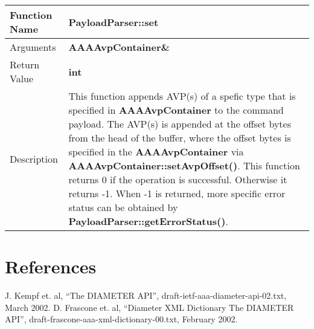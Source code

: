 \begin{flushleft}
\begin{tabular}[t]{|l|p{3in}|}\hline
 Function Name & {\bf PayloadParser::set}
\\\hline
 Arguments & {\bf AAAAvpContainer\&}\\\hline
 Return Value & {\bf int}
\\\hline
 Description &  
 This function appends AVP(s) of a spefic type that is specified 
 in {\bf AAAAvpContainer} to the command payload.  The AVP(s) is appended 
 at the offset bytes from the head of the buffer, where the offset bytes
 is specified in the {\bf AAAAvpContainer} via {\bf
 AAAAvpContainer::setAvpOffset()}.
 This function returns 0 if 
 the operation is successful.  Otherwise it returns -1.  
 When -1 is returned, more specific
 error status can be obtained by {\bf PayloadParser::getErrorStatus()}.
\\\hline
\end{tabular}
\end{flushleft}


\section{References}

\begin{thebibliography}{99}
 J. Kempf et. al, ``The DIAMETER API'', 
draft-ietf-aaa-diameter-api-02.txt, March 2002.
 D. Frascone et. al, ``Diameter XML Dictionary
The DIAMETER API'', draft-frascone-aaa-xml-dictionary-00.txt, February 2002.
\end{thebibliography}

